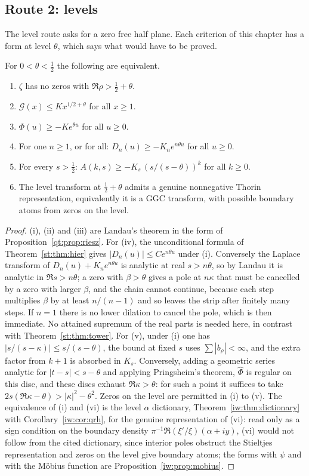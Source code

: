 \subsection{Route 2: levels}
The level route asks for a zero free half plane. Each criterion of this chapter has a form at level $\theta$, which says what would have to be proved.
\begin{theorem}\label{st:thm:levels}
For $0<\theta<\tfrac12$ the following are equivalent.
\begin{enumerate}
\item[(i)] $\zeta$ has no zeros with $\Re\rho>\tfrac12+\theta$.
\item[(ii)] $\mathcal G(x)\le Kx^{1/2+\theta}$ for all $x\ge1$.
\item[(iii)] $\Phi(u)\ge-Ke^{\theta u}$ for all $u\ge0$.
\item[(iv)] For one $n\ge1$, or for all: $D_n(u)\ge-K_ne^{n\theta u}$ for all $u\ge0$.
\item[(v)] For every $s>\tfrac12$: $A(k,s)\ge-K_s\,(s/(s-\theta))^{k}$ for all $k\ge0$.
\item[(vi)] The level transform at $\tfrac12+\theta$ admits a genuine nonnegative Thorin representation, equivalently it is a GGC transform, with possible boundary atoms from zeros on the level.
\end{enumerate}
\end{theorem}
\begin{proof}
(i), (ii) and (iii) are Landau's theorem in the form of Proposition~\ref{qt:prop:riesz}. For (iv), the unconditional formula of Theorem~\ref{st:thm:hier} gives $|D_n(u)|\le Ce^{n\theta u}$ under (i). Conversely the Laplace transform of $D_n(u)+K_ne^{n\theta u}$ is analytic at real $s>n\theta$, so by Landau it is analytic in $\Re s>n\theta$; a zero with $\beta>\theta$ gives a pole at $n\kappa$ that must be cancelled by a zero with larger $\beta$, and the chain cannot continue, because each step multiplies $\beta$ by at least $n/(n-1)$ and so leaves the strip after finitely many steps. If $n=1$ there is no lower dilation to cancel the pole, which is then immediate. No attained supremum of the real parts is needed here, in contrast with Theorem~\ref{st:thm:tower}. For (v), under (i) one has $|s/(s-\kappa)|\le s/(s-\theta)$, the bound at fixed $s$ uses $\sum|b_\rho|<\infty$, and the extra factor from $k+1$ is absorbed in $K_s$. Conversely, adding a geometric series analytic for $|t-s|<s-\theta$ and applying Pringsheim's theorem, $\hat\Phi$ is regular on this disc, and these discs exhaust $\Re\kappa>\theta$: for such a point it suffices to take $2s(\Re\kappa-\theta)>|\kappa|^2-\theta^2$. Zeros on the level are permitted in (i) to (v). The equivalence of (i) and (vi) is the level $\alpha$ dictionary, Theorem~\ref{iw:thm:dictionary} with Corollary~\ref{iw:cor:qrh}, for the genuine representation of (vi): read only as a sign condition on the boundary density $\pi^{-1}\Re(\xi'/\xi)(\alpha+iy)$, (vi) would not follow from the cited dictionary, since interior poles obstruct the Stieltjes representation and zeros on the level give boundary atoms; the forms with $\psi$ and with the M\"obius function are Proposition~\ref{iw:prop:mobius}.
\end{proof}
